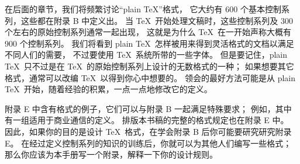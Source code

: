 在后面的章节，我们将频繁讨论``plain \TeX''格式，
它大约有 600 个基本控制系列，这些都在附录 B 中定义出。
当 \TeX\ 开始处理文稿时，这些控制系列及 300 个左右的原始控制系列通常一起出现，
\1这就是为什么 \TeX\ 在一开始声称大概有 900 个控制系列。%
我们将看到 plain \TeX\ 怎样被用来得到灵活格式的文档以满足不同人们的需要，
不过要使用 \TeX\ 系统所带的一些字体。%
但是要记住，plain \TeX\ 只不过是在 \TeX\ 的原始控制系列上设计的无数格式的一种；
如果想要其它格式，通常可以改编 \TeX\ 以得到你心中想要的。%
领会的最好方法可能是从 plain \TeX\ 开始，随着经验的积累，一点一点地修改它的定义。

\danger 附录 E 中含有格式的例子，它们可以与附录 B 一起满足特殊要求；
例如，其中有一组适用于商业通信的定义。%
排版本书稿的完整的格式规定也在附录 E 中。%
因此，如果你的目的是设计 \TeX\ 格式，在学会附录 B 后你可能要研究研究附录 E。%
在经过定义控制系列的知识的训练后，你就可以为其他人们编写一些格式；
那么你应该为本手册写一个附录，解释一下你的设计规则。

